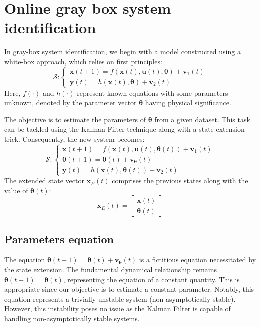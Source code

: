 \section{Online gray box system identification}

In gray-box system identification, we begin with a model constructed using a white-box approach, which relies on first principles:
\[\mathcal{S}:\begin{cases}
    \mathbf{x}(t+1)=f(\mathbf{x}(t),\mathbf{u}(t),{\boldsymbol{\theta}})+\mathbf{v}_1(t) \\
    \mathbf{y}(t)=h(\mathbf{x}(t),{\boldsymbol{\theta}})+\mathbf{v}_2(t)
\end{cases}\]
Here, $f(\cdot)$ and $h(\cdot)$ represent known equations with some parameters unknown, denoted by the parameter vector ${\boldsymbol{\theta}}$ having physical significance.

The objective is to estimate the parameters of ${\boldsymbol{\theta}}$ from a given dataset. This task can be tackled using the Kalman Filter technique along with a state extension trick. 
Consequently, the new system becomes:
\[\mathcal{S}:\begin{cases}
    \mathbf{x}(t+1)=f(\mathbf{x}(t),\mathbf{u}(t),{\boldsymbol{\theta}}(t))+\mathbf{v}_1(t) \\
    {\boldsymbol{\theta}}(t+1)={\boldsymbol{\theta}}(t)+\mathbf{v}_{{\boldsymbol{\theta}}}(t) \\
    \mathbf{y}(t)=h(\mathbf{x}(t),{\boldsymbol{\theta}}(t))+\mathbf{v}_2(t)
\end{cases}\]
The extended state vector $\mathbf{x}_E(t)$ comprises the previous states along with the value of ${\boldsymbol{\theta}}(t)$: 
\[\mathbf{x}_E(t)=\begin{bmatrix} \mathbf{x}(t) \\ {\boldsymbol{\theta}}(t) \end{bmatrix}\]

\subsection{Parameters equation} 
The equation ${\boldsymbol{\theta}}(t+1)={\boldsymbol{\theta}}(t)+\mathbf{v}_{{\boldsymbol{\theta}}}(t)$ is a fictitious equation necessitated by the state extension.
The fundamental dynamical relationship remains ${\boldsymbol{\theta}}(t+1)={\boldsymbol{\theta}}(t)$, representing the equation of a constant quantity.
This is appropriate since our objective is to estimate a constant parameter.
Notably, this equation represents a trivially unstable system (non-asymptotically stable). 
However, this instability poses no issue as the Kalman Filter is capable of handling non-asymptotically stable systems.


